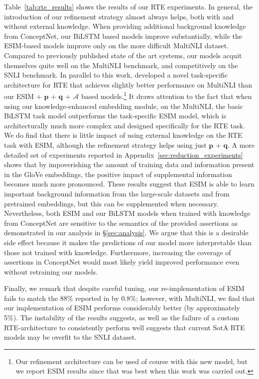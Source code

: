 \documentclass[11pt,a4paper]{article}
\begin{document}
Table~\ref{tab:rte_results} shows the results of our RTE experiments. In general, the introduction of our refinement strategy almost always helps, both with and without external knowledge. When providing additional background knowledge from ConceptNet, our BiLSTM based models improve substantially, while the ESIM-based models improve only on the more difficult MultiNLI dataset. Compared to previously published state of the art systems, our models acquit themselves quite well on the MultiNLI benchmark, and competitively on the SNLI benchmark. In parallel to this work, \citet{gong2017natural} developed a novel task-specific architecture for RTE that achieves slightly better performance on MultiNLI than our ESIM + $\boldsymbol{p}$ + $\boldsymbol{q}$ + $\mathcal{A}$ based models.\footnote{Our refinement architecture can be used of course with this new model, but we report ESIM results since that was best when this work was carried out.} It draws attention to the fact that when using our knowledge-enhanced embedding module, on the MultiNLI, the basic BiLSTM task model outperforms the task-specific ESIM model, which is architecturally much more complex and designed specifically for the RTE task.
We do find that there is little impact of using external knowledge on the RTE task with ESIM, although the refinement strategy helps using just $\boldsymbol{p}$ + $\boldsymbol{q}$. A more detailed set of experiments reported in Appendix~\ref{sec:reduction_experiments} shows that by impoverishing the amount of training data and information present in the GloVe embeddings, the positive impact of supplemental information becomes much more pronounced. These results suggest that ESIM is able to learn important background information from the large-scale datasets and from pretrained embeddings, but this can be supplemented when necessary. Nevertheless, both ESIM and our BiLSTM models when trained with knowledge from ConceptNet are sensitive to the semantics of the provided assertions as demonstrated in our analysis in \S\ref{sec:analysis}. We argue that this is a desirable side effect because it makes the predictions of our model more interpretable than those not trained with knowledge. Furthermore, increasing the coverage of assertions in ConceptNet would most likely yield improved performance even without retraining our models.

Finally, we remark that despite careful tuning, our re-implementation of ESIM fails to match the 88\% reported in \citet{Chen2017_ESIM} by 0.8\%; however, with MultiNLI, we find that our implementation of ESIM performs considerably better (by approximately 5\%). The instability of the results suggests, as well as the failure of a custom RTE-architecture to consistently perform well suggests that current SotA RTE models may be overfit to the SNLI dataset.
\end{document}
